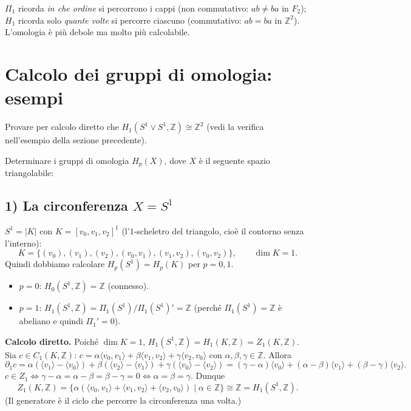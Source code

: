 \begin{intuizione}
$\Pi_1$ ricorda \emph{in che ordine} si percorrono i cappi (non commutativo: $ab \neq ba$ in $F_2$); $H_1$ ricorda solo \emph{quante volte} si percorre ciascuno (commutativo: $ab = ba$ in $\mathbb{Z}^2$). L'omologia \`e pi\`u debole ma molto pi\`u calcolabile.
\end{intuizione}


\section{Calcolo dei gruppi di omologia: esempi}

\begin{ejercicio*}
Provare per calcolo diretto che $H_1(S^1 \vee S^1, \mathbb{Z}) \cong \mathbb{Z}^2$ (vedi la verifica nell'esempio della sezione precedente).
\end{ejercicio*}

\begin{ejercicio*}
Determinare i gruppi di omologia $H_p(X)$, dove $X$ \`e il seguente spazio triangolabile:
\end{ejercicio*}

\subsection{1) La circonferenza $X = S^1$}

$S^1 = |K|$ con $K = [v_0, v_1, v_2]^1$ (l'$1$-scheletro del triangolo, cio\`e il contorno senza l'interno):
\[
K = \{ (v_0), (v_1), (v_2), (v_0, v_1), (v_1, v_2), (v_0, v_2) \}, \qquad \dim K = 1 .
\]
Quindi dobbiamo calcolare $H_p(S^1) = H_p(K)$ per $p = 0, 1$.
\begin{itemize}
    \item $p = 0$: $H_0(S^1, \mathbb{Z}) = \mathbb{Z}$ (connesso).
    \item $p = 1$: $H_1(S^1, \mathbb{Z}) = \Pi_1(S^1)/\Pi_1(S^1)' = \mathbb{Z}$ (perch\'e $\Pi_1(S^1) = \mathbb{Z}$ \`e abeliano e quindi $\Pi_1' = 0$).
\end{itemize}
\textbf{Calcolo diretto.} Poich\'e $\dim K = 1$, $H_1(S^1, \mathbb{Z}) = H_1(K, \mathbb{Z}) = Z_1(K, \mathbb{Z})$. Sia $c \in C_1(K, \mathbb{Z})$: $c = \alpha \langle v_0, v_1 \rangle + \beta \langle v_1, v_2 \rangle + \gamma \langle v_2, v_0 \rangle$ con $\alpha, \beta, \gamma \in \mathbb{Z}$. Allora
\[
\partial_1 c = \alpha(\langle v_1 \rangle - \langle v_0 \rangle) + \beta(\langle v_2 \rangle - \langle v_1 \rangle) + \gamma(\langle v_0 \rangle - \langle v_2 \rangle) = (\gamma - \alpha)\langle v_0 \rangle + (\alpha - \beta)\langle v_1 \rangle + (\beta - \gamma)\langle v_2 \rangle .
\]
$c \in Z_1 \iff \gamma - \alpha = \alpha - \beta = \beta - \gamma = 0 \iff \alpha = \beta = \gamma$. Dunque
\[
Z_1(K, \mathbb{Z}) = \{ \alpha ( \langle v_0, v_1 \rangle + \langle v_1, v_2 \rangle + \langle v_2, v_0 \rangle ) \mid \alpha \in \mathbb{Z} \} \cong \mathbb{Z} = H_1(S^1, \mathbb{Z}).
\]
(Il generatore \`e il ciclo che percorre la circonferenza una volta.)

